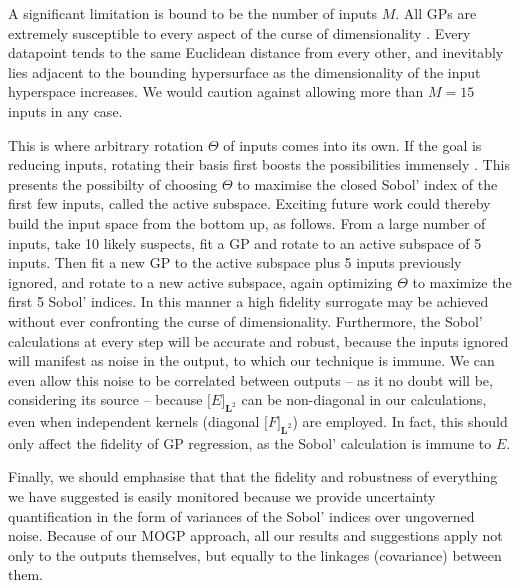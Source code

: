 \documentclass[preprint,12pt]{elsarticle}
\newcommand*{\mi}[1]{\mathbf{#1}}
\newcommand*{\tte}[2][]{\lbrack{#2}\rbrack_{#1}}
\begin{document}
    A significant limitation is bound to be the number of inputs $M$. All GPs are extremely susceptible to every aspect of the curse of dimensionality \cite{Bellman1966,Binois2021}. Every datapoint tends to the same Euclidean distance from every other, and inevitably lies adjacent to the bounding hypersurface as the dimensionality of the input hyperspace increases. We would caution against allowing more than $M=15$ inputs in any case.

    This is where arbitrary rotation $\Theta$ of inputs comes into its own. If the goal is reducing inputs, rotating their basis first boosts the possibilities immensely \cite{Constantine2015}. This presents the possibilty of choosing $\Theta$ to maximise the closed Sobol' index of the first few inputs, called the active subspace.
    Exciting future work could thereby build the input space from the bottom up, as follows. From a large number of inputs, take 10 likely suspects, fit a GP and rotate to an active subspace of 5 inputs. Then fit a new GP to the active subspace plus 5 inputs previously ignored, and rotate to a new active subspace, again optimizing $\Theta$ to maximize the first 5 Sobol' indices. In this manner a high fidelity surrogate may be achieved without ever confronting the curse of dimensionality. Furthermore, the Sobol' calculations at every step will be accurate and robust, because the inputs ignored will manifest as noise in the output, to which our technique is immune. We can even allow this noise to be correlated between outputs -- as it no doubt will be, considering its source -- because $\tte[\mi{L}^{2}]{E}$ can be non-diagonal in our calculations, even when independent kernels (diagonal $\tte[\mi{L}^{2}]{F}$) are employed. In fact, this should only affect the fidelity of GP regression, as the Sobol' calculation is immune to $E$.

    Finally, we should emphasise that that the fidelity and robustness of everything we have suggested is easily monitored because we provide uncertainty quantification in the form of variances of the Sobol' indices over ungoverned noise. Because of our MOGP approach, all our results and suggestions apply not only to the outputs themselves, but equally to the linkages (covariance) between them.




 

\end{document}
